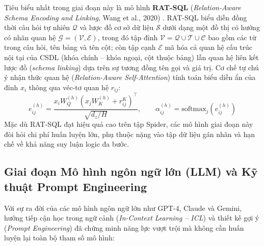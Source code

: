 \documentclass[12pt,a4paper]{report}
\begin{document}
Tiêu biểu nhất trong giai đoạn này là mô hình \textbf{RAT-SQL} (\textit{Relation-Aware Schema Encoding and Linking}, Wang et al., 2020) \cite{wang2020ratsql}. RAT-SQL biểu diễn đồng thời câu hỏi tự nhiên $\mathcal{Q}$ và lược đồ cơ sở dữ liệu $\mathcal{S}$ dưới dạng một đồ thị có hướng có nhãn quan hệ $\mathcal{G} = (\mathcal{V}, \mathcal{E})$, trong đó tập đỉnh $\mathcal{V} = \mathcal{Q} \cup \mathcal{T} \cup \mathcal{C}$ bao gồm các từ trong câu hỏi, tên bảng và tên cột; còn tập cạnh $\mathcal{E}$ mã hóa cả quan hệ cấu trúc nội tại của CSDL (khóa chính -- khóa ngoại, cột thuộc bảng) lẫn quan hệ liên kết lược đồ (\textit{schema linking}) dựa trên sự tương đồng tên gọi và giá trị. Cơ chế tự chú ý nhận thức quan hệ (\textit{Relation-Aware Self-Attention}) tính toán biểu diễn ẩn của đỉnh $x_i$ thông qua véc-tơ quan hệ $r_{ij}$:
\begin{equation}
    e_{ij}^{(h)} = \frac{x_i W_Q^{(h)} \left( x_j W_K^{(h)} + r_{ij}^K \right)^\top}{\sqrt{d_z / H}}, \qquad \alpha_{ij}^{(h)} = \text{softmax}_j\left(e_{ij}^{(h)}\right)
    \label{eq:ratsql_attention}
\end{equation}
Mặc dù RAT-SQL đạt hiệu quả cao trên tập Spider, các mô hình giai đoạn này đòi hỏi chi phí huấn luyện lớn, phụ thuộc nặng vào tập dữ liệu gán nhãn và hạn chế về khả năng suy luận logic đa bước.

\subsection{Giai đoạn Mô hình ngôn ngữ lớn (LLM) và Kỹ thuật Prompt Engineering}
Với sự ra đời của các mô hình ngôn ngữ lớn như GPT-4, Claude và Gemini, hướng tiếp cận học trong ngữ cảnh (\textit{In-Context Learning -- ICL}) và thiết kế gợi ý (\textit{Prompt Engineering}) đã chứng minh năng lực vượt trội mà không cần huấn luyện lại toàn bộ tham số mô hình:
\end{document}
